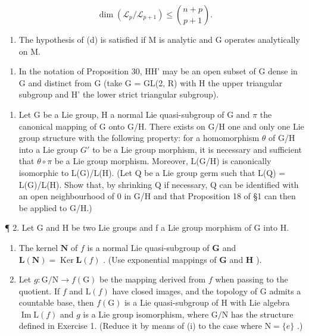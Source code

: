 \[
\dim (\mathcal {L} _ {p} / \mathcal {L} _ {p + 1}) \leqslant \binom {n + p} {p + 1}.
\]

\begin{enumerate}
\def\labelenumi{(\alph{enumi})}
\setcounter{enumi}{4}
\tightlist
\item
  The hypothesis of (d) is satisfied if M is analytic and G operates analytically on M.
\end{enumerate}

\begin{enumerate}
\def\labelenumi{\arabic{enumi}.}
\setcounter{enumi}{8}
\tightlist
\item
  In the notation of Proposition 30, HH' may be an open subset of G dense in G and distinct from G (take G = GL(2, R) with H the upper triangular subgroup and H' the lower strict triangular subgroup).
\end{enumerate}


\begin{enumerate}
\def\labelenumi{\arabic{enumi}.}
\tightlist
\item
  Let G be a Lie group, H a normal Lie quasi-subgroup of G and \(\pi\) the canonical mapping of G onto G/H. There exists on G/H one and only one Lie group structure with the following property: for a homomorphism \(\theta\) of G/H into a Lie group \(G'\) to be a Lie group morphism, it is necessary and sufficient that \(\theta \circ \pi\) be a Lie group morphism. Moreover, L(G/H) is canonically isomorphic to L(G)/L(H). (Let Q be a Lie group germ such that L(Q) = L(G)/L(H). Show that, by shrinking Q if necessary, Q can be identified with an open neighbourhood of 0 in G/H and that Proposition 18 of §1 can then be applied to G/H.)
\end{enumerate}

¶ 2. Let G and H be two Lie groups and f a Lie group morphism of G into H.

\begin{enumerate}
\def\labelenumi{(\roman{enumi})}
\item
  The kernel \(\mathbf{N}\) of \(f\) is a normal Lie quasi-subgroup of \(\mathbf{G}\) and \(\mathbf{L}(\mathbf{N}) = \operatorname{Ker} \mathbf{L}(f)\) . (Use exponential mappings of \(\mathbf{G}\) and \(\mathbf{H}\) ).
\item
  Let \(g \colon \mathrm{G} / \mathrm{N} \to f(\mathrm{G})\) be the mapping derived from \(f\) when passing to the quotient. If \(f\) and \(\mathrm{L}(f)\) have closed images, and the topology of \(\mathrm{G}\) admits a countable base, then \(f(\mathrm{G})\) is a Lie quasi-subgroup of \(\mathrm{H}\) with Lie algebra \(\operatorname{Im} \mathrm{L}(f)\) and \(g\) is a Lie group isomorphism, where \(\mathrm{G} / \mathrm{N}\) has the structure defined in Exercise 1. (Reduce it by means of (i) to the case where \(\mathrm{N} = \{e\}\) .)
\end{enumerate}

